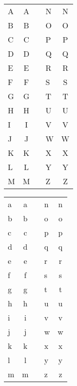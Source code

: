 \documentclass[a4paper]{article}
\newcommand{\wb}[2]{\fontsize{#1}{#2}\usefont{U}{webo}{xl}{n}}
\newcommand{\showb}[1]{\wb{20}{24}#1}
\begin{document}
\begin{center}
  \begin{tabular}{lcp{1in}lc}
    A & \showb{A} & & N & \showb{N} \\[1ex]
    B & \showb{B} & & O & \showb{O} \\[1ex]
    C & \showb{C} & & P & \showb{P} \\[1ex]
    D & \showb{D} & & Q & \showb{Q} \\[1ex]
    E & \showb{E} & & R & \showb{R} \\[1ex]
    F & \showb{F} & & S & \showb{S} \\[1ex]
    G & \showb{G} & & T & \showb{T} \\[1ex]
    H & \showb{H} & & U & \showb{U} \\[1ex]
    I & \showb{I} & & V & \showb{V} \\[1ex]
    J & \showb{J} & & W & \showb{W} \\[1ex]
    K & \showb{K} & & X & \showb{X} \\[1ex]
    L & \showb{L} & & Y & \showb{Y} \\[1ex]
    M & \showb{M} & & Z & \showb{Z}
  \end{tabular}
\end{center}
\pagebreak
\begin{center}
  \begin{tabular}{lcp{1in}lc}
    a & \showb{a} & & n & \showb{n} \\[1ex]
    b & \showb{b} & & o & \showb{o} \\[1ex]
    c & \showb{c} & & p & \showb{p} \\[1ex]
    d & \showb{d} & & q & \showb{q} \\[1ex]
    e & \showb{e} & & r & \showb{r} \\[1ex]
    f & \showb{f} & & s & \showb{s} \\[1ex]
    g & \showb{g} & & t & \showb{t} \\[1ex]
    h & \showb{h} & & u & \showb{u} \\[1ex]
    i & \showb{i} & & v & \showb{v} \\[1ex]
    j & \showb{j} & & w & \showb{w} \\[1ex]
    k & \showb{k} & & x & \showb{x} \\[1ex]
    l & \showb{l} & & y & \showb{y} \\[1ex]
    m & \showb{m} & & z & \showb{z}
  \end{tabular}
\end{center}
\pagebreak
\end{document}
